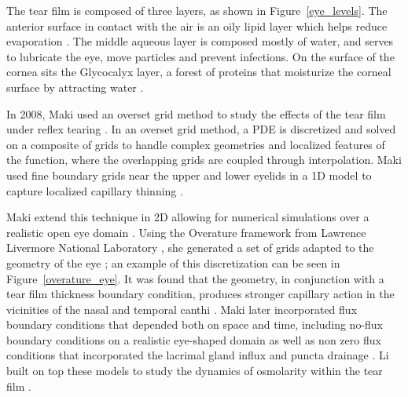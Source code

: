 	The tear film is composed of three layers, as shown in Figure~\ref{eye_levels}. The anterior surface in contact with the air is an oily lipid layer which helps reduce evaporation \cite{norn1979semiquantitative,mishima1961oily}. The middle aqueous layer is composed mostly of water, and serves to lubricate the eye, move particles and prevent infections. On the surface of the cornea sits the Glycocalyx layer, a forest of proteins that moisturize the corneal surface by attracting water \cite{gipson2004distribution}. 
	
 In 2008, Maki used an \textrm{overset grid} method to study the effects of the tear film under reflex tearing \cite{maki2008overset}. In an overset grid method, a PDE is discretized and solved on a composite of grids to handle complex geometries and localized features of the function, where the overlapping grids are coupled through interpolation. Maki used fine boundary grids near the upper and lower eyelids in a 1D model to capture localized capillary thinning \cite{maki2008overset}.
	
	Maki extend this technique in 2D allowing for numerical simulations over a realistic open eye domain \cite{maki2010tear,maki2010tear2}. Using the Overature framework from Lawrence Livermore National Laboratory \cite{chesshire1990composite,henshaw1998ogen}, she generated a set of grids adapted to the geometry of the eye \cite{chesshire1990composite}; an example of this discretization can be seen in Figure~\ref{overature_eye}. It was found that the geometry, in conjunction with a tear film thickness boundary condition, produces stronger capillary action in the vicinities of the nasal and temporal canthi \cite{maki2010tear}. Maki later incorporated flux boundary conditions that depended both on space and time, including no-flux boundary conditions on a realistic eye-shaped domain as well as non zero flux conditions that incorporated the lacrimal gland influx and puncta drainage \cite{maki2010tear2}. Li built on top these models to study the dynamics of osmolarity within the tear film \cite{li2012model,li2015computed}.
	
